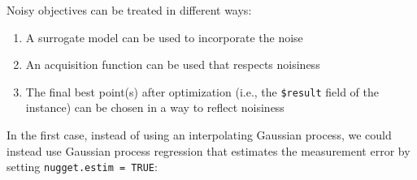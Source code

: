 \begin{Shaded}
\begin{Highlighting}[]
\OtherTok{=} 
\OtherTok{=}  \SpecialCharTok{*}\SpecialCharTok{$}\SpecialCharTok{*} \NormalTok{(} \SpecialCharTok{*}\SpecialCharTok{$}\SpecialCharTok{+} \NormalTok{(}\NormalTok{, } \NormalTok{, } \NormalTok{)}
\NormalTok{\}}
\OtherTok{=} \NormalTok{(} \NormalTok{(} \NormalTok{, } \NormalTok{))}
\OtherTok{=} \NormalTok{(} \NormalTok{(} \NormalTok{))}
\OtherTok{=}\SpecialCharTok{$}
   \NormalTok{)}
\end{Highlighting}
\end{Shaded}

Noisy objectives can be treated in different ways:

\begin{enumerate}
\def\labelenumi{\arabic{enumi}.}
\tightlist
\item
  A surrogate model can be used to incorporate the noise
\item
  An acquisition function can be used that respects noisiness
\item
  The final best point(s) after optimization (i.e., the
  \texttt{\$result} field of the instance) can be chosen in a way to
  reflect noisiness
\end{enumerate}

In the first case, instead of using an interpolating Gaussian
process, we could instead use Gaussian process
regression that estimates the measurement error by setting
\texttt{nugget.estim\ =\ TRUE}:

\begin{Shaded}
\begin{Highlighting}[]
\NormalTok{(}\NormalTok{(}\NormalTok{, } \NormalTok{))}
\end{Highlighting}
\end{Shaded}

